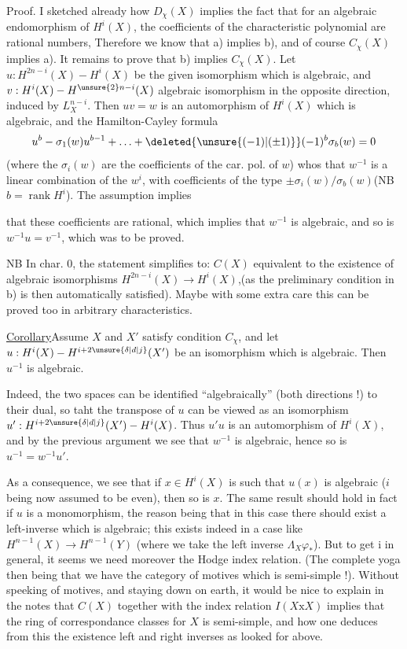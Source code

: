 Proof. I sketched already how $D_{\chi}(X)$ implies the fact that for an algebraic endomorphism of $H^i(X)$, the coefficients of the characteristic polynomial are rational numbers, Therefore we know that a) implies b), and of course $C_{\chi}(X)$ implies a). It remains to prove that b) implies $C_{\chi}(X)$. Let $u:H^{2n-i}(X)\mathbin{-}H^i(X)$ be the given isomorphism which is algebraic, and $v:H^i(X)\mathbin{-}H^{\unsure{2}n-i}(X)$  algebraic isomorphism in the opposite direction, induced by $L_X^{n-i}$. Then $uv=w$ is an automorphism of $H^i(X)$ which is algebraic, and the Hamilton-Cayley formula
\[
u^{b}-\sigma_1(w)u^{b-1}+\ldots+\deleted{\unsure{(-1)|(\pm1)}}(-1)^b\sigma_b(w)=0
\]
(where the $\sigma_i(w)$ are the coefficients of the car. pol. of $w$) whos that $w^{-1}$ is a linear combination of the $w^i$, with coefficients of the type $\pm\sigma_i(w)/\sigma_b(w)$\quad (NB $b=\operatorname{rank}H^i$). The assumption implies



that these coefficients are rational, which implies that $w^{-1}$ is algebraic, and so is $w^{-1}u=v^{-1}$, which was to be proved.

NB In char. 0,  the statement simplifies to: $C(X)$ equivalent to the existence of algebraic isomorphisms $H^{2n-i}(X)\to H^i(X)$,(as the preliminary condition in b) is then automatically satisfied). Maybe with some extra care this can be proved too in arbitrary characteristics.

\uline{Corollary}\quad Assume $X$ and $X'$ satisfy condition $C_{\chi}$, and let $u:H^i(X)\mathbin{-}H^{i+2\unsure{\delta|d|j}}(X')$  be an isomorphism which is algebraic. Then $u^{-1}$ is algebraic.

Indeed, the two spaces can be identified ``algebraically'' (both directions !) to their dual, so taht the transpose of $u$ can be viewed as an isomorphism $u':H^{i+2\unsure{\delta|d|j}}(X')\mathbin{-}H^i(X)$. Thus $u'u$ is an  automorphism  of $H^i(X)$, and by the previous argument we see that $w^{-1}$ is algebraic, hence so is $u^{-1}=w^{-1}u'$.

As a consequence, we see that if $x\in H^i(X)$ is such that $u(x)$ is algebraic ($i$ being now assumed to be even), then so is $x$. The same result should hold in fact if $u$ is a monomorphism, the reason being that in this case there should exist a left-inverse which is algebraic; this exists indeed in a case like $H^{n-1}(X)\to H^{n-1}(Y)$ (where we take the left inverse $\Lambda_X\varphi_*$). But to get i in general, it seems we need moreover the Hodge index relation. (The complete yoga then being that we have the category of motives which is semi-simple !). Without speeking of motives, and staying down on earth, it would be nice to explain in the notes that $C(X)$ together with the index relation $I(X\mathrm{x}X)$ implies that the ring of correspondance classes for $X$ is semi-simple, and how one deduces from this the existence  left and right inverses as looked for above.

